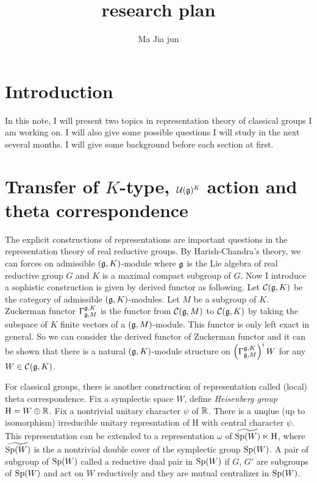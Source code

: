\documentclass{amsart}
\begin{document}
\title{research plan}
\author{Ma Jia jun}
\maketitle

\section{Introduction}
In this note, I will present two topics in representation theory of
classical groups I am working on. I will also give some possible
questions I will study in the next several months. I will give some
background before each section  at first.


\section{Transfer of $K$-type, $\mathcal{U}(\mathfrak{g})^K$ action and  theta correspondence}
The explicit constructions of representations are important questions
in the representation theory of real reductive groups. By
Harish-Chandra's theory, we can forces on admissible $(\mathfrak{g},K)$-module
where $\mathfrak{g}$ is the Lie algebra of real reductive group $G$ and $K$ is
a maximal compact subgroup of $G$.  Now I introduce a sophistic
construction is given by derived functor as following.  Let
$\mathcal{C}(\mathfrak{g},K)$ be the category of admissible $(\mathfrak{g}, K)$-modules.  Let
$M$ be a subgroup of $K$.  Zuckerman functor
$\Gamma_{\mathfrak{g},M}^{\mathfrak{g},K}$ is the functor from $\mathcal{C}(\mathfrak{g},M)$ to $
\mathcal{C}(\mathfrak{g},K)$ by taking the subspace of $K$ finite vectors of a $(\mathfrak{g},
M)$-module.  This functor is only left exact in general.  So we can
consider the derived functor of Zuckerman functor and it can be shown
that there is a natural $(\mathfrak{g},K)$-module structure on
$\left(\Gamma_{\mathfrak{g},M}^{\mathfrak{g},K}\right)^iW$ for any $W\in \mathcal{C}(\mathfrak{g},K)$.

For classical groups, there is another construction of representation
called (local) theta correspondence.  
Fix a symplectic space $W$, define
\emph{Heisenberg group} $\mathrm{H} = W\oplus {\mathbb{R}}$. Fix a nontrivial
unitary character $\psi$ of ${\mathbb{R}}$.  There is a unqiue (up to
isomorphism) irreducible unitary represntation of $\mathrm{H}$ with
central character $\psi$.  This representation can be extended to a
representation $\omega$ of $\widetilde{{\rm Sp}(W)}\ltimes \mathrm{H}$,
where $\widetilde{{\rm Sp}(W)}$ is the a nontrivial double cover of the
symplectic group ${\rm Sp}(W)$.
A pair of subgroup of ${\rm Sp}(W)$ called  a reductive dual pair in ${\rm Sp}(W)$ if $G$, $G'$  are subgroups of ${\rm Sp}(W)$ and act on $W$ reductively
and they are mutual centralizer in ${\rm Sp}(W)$. 
\end{document}
